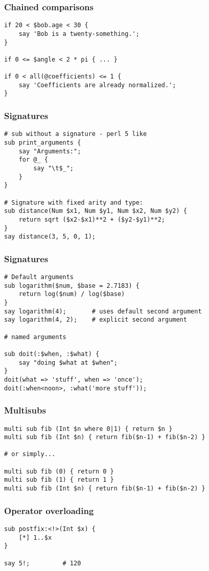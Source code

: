 \documentclass{beamer}
\begin{document}
\begin{frame}[fragile]
\frametitle{Chained comparisons}
\begin{verbatim}
if 20 < $bob.age < 30 {
    say 'Bob is a twenty-something.';
}

if 0 <= $angle < 2 * pi { ... }

if 0 < all(@coefficients) <= 1 {
    say 'Coefficients are already normalized.';
}
\end{verbatim}
\end{frame}

\begin{frame}[fragile]
\frametitle{Signatures}
\begin{verbatim}
# sub without a signature - perl 5 like
sub print_arguments {
    say "Arguments:";
    for @_ {
        say "\t$_";
    }
}

# Signature with fixed arity and type:
sub distance(Num $x1, Num $y1, Num $x2, Num $y2) {
    return sqrt ($x2-$x1)**2 + ($y2-$y1)**2;
}
say distance(3, 5, 0, 1); 
\end{verbatim}
\end{frame}

\begin{frame}[fragile]
\frametitle{Signatures}
\begin{verbatim}
# Default arguments
sub logarithm($num, $base = 2.7183) {
    return log($num) / log($base)
}
say logarithm(4);       # uses default second argument
say logarithm(4, 2);    # explicit second argument

# named arguments

sub doit(:$when, :$what) {
    say "doing $what at $when";
}
doit(what => 'stuff', when => 'once');
doit(:when<noon>, :what('more stuff'));
\end{verbatim}
\end{frame}

\begin{frame}[fragile]
\frametitle{Multisubs}
\begin{verbatim}
multi sub fib (Int $n where 0|1) { return $n }
multi sub fib (Int $n) { return fib($n-1) + fib($n-2) }

# or simply...

multi sub fib (0) { return 0 }
multi sub fib (1) { return 1 }
multi sub fib (Int $n) { return fib($n-1) + fib($n-2) }
\end{verbatim}
\end{frame}

\begin{frame}[fragile]
\frametitle{Operator overloading}
\begin{verbatim}
sub postfix:<!>(Int $x) {
    [*] 1..$x
}

say 5!;         # 120
\end{verbatim}
\end{frame}
\end{document}
